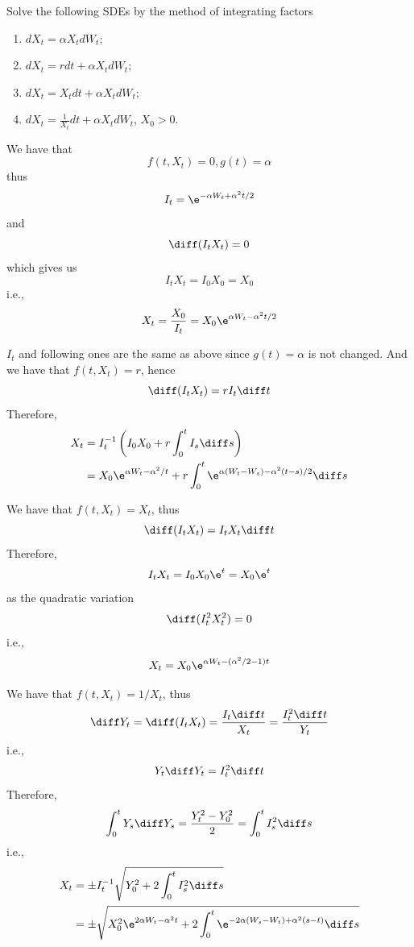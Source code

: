     \problem
    \begin{question}
        Solve the following SDEs by the method of integrating factors
        \begin{enumerate}[label=(\alph*)]
        \item $dX_t=\alpha X_tdW_t$;
        \item $dX_t=rdt+\alpha X_tdW_t$;
        \item $dX_t=X_tdt+\alpha X_tdW_t$;
        \item $dX_t=\frac{1}{X_t}dt+\alpha X_tdW_t$, $X_0>0$.
        \end{enumerate}
    \end{question}
    \begin{subproblem}[(\alph*)]
        \item
        We have that
        \[f(t,X_t)=0,g(t)=\alpha\]
        thus
        \[I_t=\e^{-\alpha W_t+\alpha^2t/2}\]
        and
        \[\diff(I_tX_t)=0\]
        which gives us
        \[I_tX_t=I_0X_0=X_0\]
        i.e.,
        \[X_t=\frac{X_0}{I_t}=X_0\e^{\alpha W_t-\alpha^2t/2}\]

        \item
        $I_t$ and following ones are the same as above
        since $g(t)=\alpha$ is not changed.
        And we have that $f(t,X_t)=r$, hence
        \[\diff(I_tX_t)=rI_t\diff t\]
        Therefore,
        \[\begin{aligned}
            X_t&=I_t^{-1}\left(I_0X_0+r\int_0^tI_s\diff s\right)\\
            &=X_0\e^{\alpha W_t-\alpha^2/t}+r\int_0^t\e^{\alpha(W_t-W_s)-\alpha^2(t-s)/2}\diff s
        \end{aligned}\]

        \item
        We have that $f(t,X_t)=X_t$, thus
        \[\diff(I_tX_t)=I_tX_t\diff t\]
        Therefore,
        \[I_tX_t=I_0X_0\e^t=X_0\e^t\]
        as the quadratic variation
        \[\diff(I_t^2X_t^2)=0\]
        i.e.,
        \[X_t=X_0\e^{\alpha W_t-(\alpha^2/2-1)t}\]

        \item
        We have that $f(t,X_t)=1/X_t$, thus
        \[\diff Y_t=\diff(I_tX_t)=\frac{I_t\diff t}{X_t}
        =\frac{I_t^2\diff t}{Y_t}\]
        i.e.,
        \[Y_t\diff Y_t=I_t^2\diff t\]
        Therefore,
        \[\int_0^tY_s\diff Y_s=\frac{Y_t^2-Y_0^2}{2}=\int_0^tI_s^2\diff s\]
        i.e.,
        \[\begin{aligned}
            X_t&=\pm I_t^{-1}\sqrt{Y_0^2+2\int_0^tI_s^2\diff s}\\
            &=\pm\sqrt{X_0^2\e^{2\alpha W_t-\alpha^2t}
            +2\int_0^t\e^{-2\alpha(W_s-W_t)+\alpha^2(s-t)}\diff s}
        \end{aligned}\]

    \end{subproblem}

